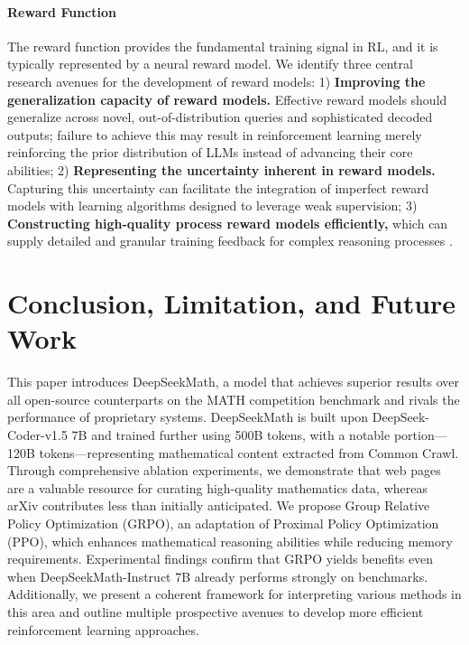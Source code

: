 \paragraph{Reward Function} The reward function provides the fundamental training signal in RL, and it is typically represented by a neural reward model. We identify three central research avenues for the development of reward models: 1) \textbf{Improving the generalization capacity of reward models.} Effective reward models should generalize across novel, out-of-distribution queries and sophisticated decoded outputs; failure to achieve this may result in reinforcement learning merely reinforcing the prior distribution of LLMs instead of advancing their core abilities; 2) \textbf{Representing the uncertainty inherent in reward models.} Capturing this uncertainty can facilitate the integration of imperfect reward models with learning algorithms designed to leverage weak supervision; 3) \textbf{Constructing high-quality process reward models efficiently,} which can supply detailed and granular training feedback for complex reasoning processes \citep{lightman2023let,wang2023math}.

\section{Conclusion, Limitation, and Future Work} This paper introduces DeepSeekMath, a model that achieves superior results over all open-source counterparts on the MATH competition benchmark and rivals the performance of proprietary systems. DeepSeekMath is built upon DeepSeek-Coder-v1.5 7B and trained further using 500B tokens, with a notable portion—120B tokens—representing mathematical content extracted from Common Crawl. Through comprehensive ablation experiments, we demonstrate that web pages are a valuable resource for curating high-quality mathematics data, whereas arXiv contributes less than initially anticipated. We propose Group Relative Policy Optimization (GRPO), an adaptation of Proximal Policy Optimization (PPO), which enhances mathematical reasoning abilities while reducing memory requirements. Experimental findings confirm that GRPO yields benefits even when DeepSeekMath-Instruct 7B already performs strongly on benchmarks. Additionally, we present a coherent framework for interpreting various methods in this area and outline multiple prospective avenues to develop more efficient reinforcement learning approaches.

